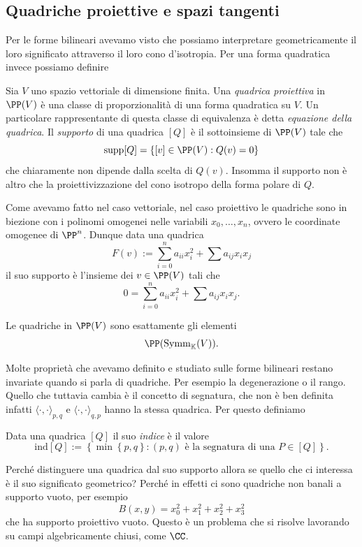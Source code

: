 \documentclass[11pt]{scrartcl}
\newcommand{\KK}{\mathbb{K}}
\begin{document}
	\subsection{Quadriche proiettive e spazi tangenti}
	Per le forme bilineari avevamo visto che possiamo interpretare geometricamente il loro significato attraverso il loro cono d'isotropia. Per una forma quadratica invece possiamo definire
	\begin{definition}[Quadrica]
		Sia $V$ uno spazio vettoriale di dimensione finita. Una \textit{quadrica proiettiva} in $\PP(V)$ è una classe di proporzionalità di una forma quadratica su $V$. Un particolare rappresentante di questa classe di equivalenza è detta \textit{equazione della quadrica}. Il \textit{supporto} di una quadrica $[Q]$ è il sottoinsieme di $\PP(V)$ tale che
		$$\text{supp}[Q]=\left\{[v]\in\PP(V):Q(v)=0\right\}$$ 
		che chiaramente non dipende dalla scelta di $Q(v)$. Insomma il supporto non è altro che la proiettivizzazione del cono isotropo della forma polare di $Q$. 
	\end{definition}
	Come avevamo fatto nel caso vettoriale, nel caso proiettivo le quadriche sono in biezione con i polinomi omogenei nelle variabili $x_0,\dots,x_n$, ovvero le coordinate omogenee di $\PP^n$. Dunque data una quadrica
	$$F(v):=\sum_{i=0}^{n}a_{ii}x_i^2+\sum a_{ij}x_ix_j$$
	il suo supporto è l'insieme dei $v\in\PP(V)$ tali che
	$$0=\sum_{i=0}^n a_{ii}x_i^2+\sum a_{ij}x_ix_j.$$
	\begin{remark}
		Le quadriche in $\PP(V)$ sono esattamente gli elementi 
		$$\PP(\text{Symm}_\KK(V)).$$
	\end{remark}
	Molte proprietà che avevamo definito e studiato sulle forme bilineari restano invariate quando si parla di quadriche. Per esempio la degenerazione o il rango. Quello che tuttavia cambia è il concetto di segnatura, che non è ben definita infatti $\langle \cdot,\cdot\rangle_{p,q}$ e $\langle \cdot,\cdot \rangle_{q,p}$ hanno la stessa quadrica. Per questo definiamo
	\begin{definition}[Indice]
		Data una quadrica $[Q]$ il suo \textit{indice} è il valore
		$$\text{ind}[Q]:=\left\{\min\left\{p,q\right\}:(p,q)\text{ è la segnatura di una $P\in [Q]$}\right\}.$$
	\end{definition} 
	Perché distinguere una quadrica dal suo supporto allora se quello che ci interessa è il suo significato geometrico? Perché in effetti ci sono quadriche non banali a supporto vuoto, per esempio
	$$B(x,y)=x_0^2+x_1^2+x_2^2+x_3^2$$
	che ha supporto proiettivo vuoto. Questo è un problema che si risolve lavorando su campi algebricamente chiusi, come $\CC$.
\end{document}
